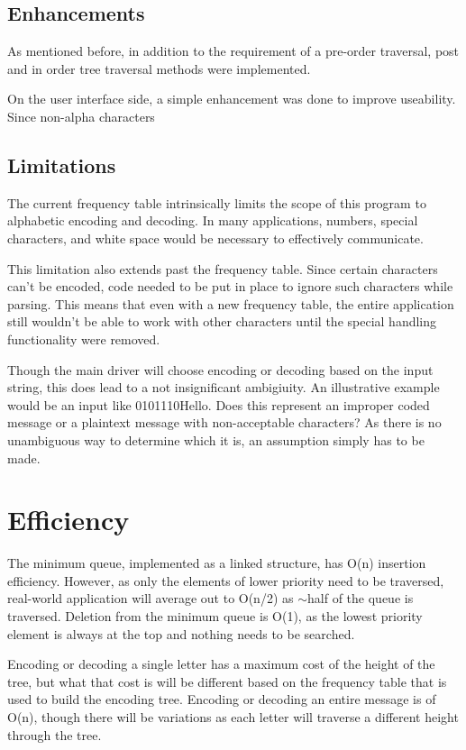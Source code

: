 \documentclass[a4paper,12pt]{article}
\begin{document}
\subsection{Enhancements}
As mentioned before, in addition to the requirement of a pre-order traversal, post and in order tree traversal methods were implemented.  

On the user interface side, a simple enhancement was done to improve useability.  Since non-alpha characters


\subsection{Limitations}
The current frequency table intrinsically limits the scope of this program to alphabetic encoding and decoding.  In many applications, numbers, special characters, and white space would be necessary to effectively communicate. 

This limitation also extends past the frequency table.  Since certain characters can't be encoded, code needed to be put in place to ignore such characters while parsing.  This means that even with a new frequency table, the entire application still wouldn't be able to work with other characters until the special handling functionality were removed.

Though the main driver will choose encoding or decoding based on the input string, this does lead to a not insignificant ambigiuity.  An illustrative example would be an input like 0101110Hello.  Does this represent an improper coded message or a plaintext message with non-acceptable characters?  As there is no unambiguous way to determine which it is, an assumption simply has to be made.


\section{Efficiency}
The minimum queue, implemented as a linked structure, has O(n) insertion efficiency.  However, as only the elements of lower priority need to be traversed, real-world application will average out to O(n/2) as $\sim$half of the queue is traversed.  Deletion from the minimum queue is O(1), as the lowest priority element is always at the top and nothing needs to be searched.

Encoding or decoding a single letter has a maximum cost of the height of the tree, but what that cost is will be different based on the frequency table that is used to build the encoding tree.  Encoding or decoding an entire message is of O(n), though there will be variations as each letter will traverse a different height through the tree.
\end{document}
